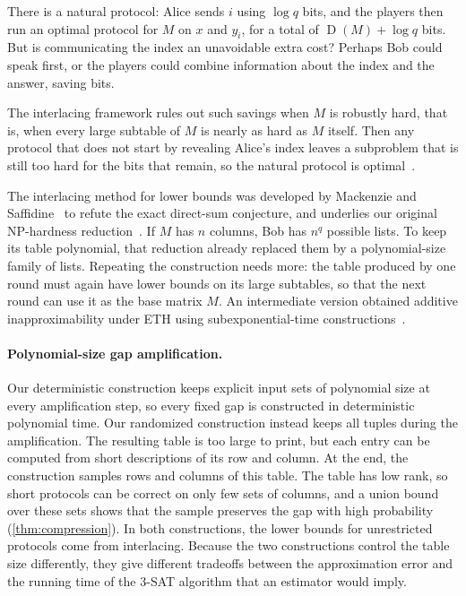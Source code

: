 \documentclass[11pt,letterpaper]{article} \usepackage[utf8]{inputenc}
\theoremstyle{plain} \newtheorem{theorem}{Theorem}[section]
\theoremstyle{definition} \newaliascnt{definition}{theorem}
\newcommand{\D}{\operatorname{D}}
\begin{document}
There is a natural protocol: Alice sends $i$ using $\log q$ bits, and the
players then run an optimal protocol for $M$ on $x$ and $y_i$, for a total
of $\D(M)+\log q$ bits. But is communicating the index an unavoidable extra
cost? Perhaps Bob could speak first, or the players could combine
information about the index and the answer, saving bits.

The interlacing framework rules out such savings when $M$ is robustly
hard, that is, when every large subtable of $M$ is nearly as hard as $M$
itself. Then any protocol that does not start by revealing Alice's index
leaves a subproblem that is still too hard for the bits that remain, so
the natural protocol is optimal~\cite{mackenzie2025refuting,gaspers-he-mackenzie-npcc}.

The interlacing method for lower bounds was developed by Mackenzie and
Saffidine~\cite{mackenzie2025refuting} to refute the exact direct-sum
conjecture, and underlies our original NP-hardness
reduction~\cite{gaspers-he-mackenzie-npcc}.
If $M$ has $n$ columns, Bob has $n^q$ possible lists. To keep its table
polynomial, that reduction already replaced them by a polynomial-size
family of lists.
Repeating the construction needs more: the table produced by one round must
again have lower bounds on its large subtables, so that the next round can
use it as the base matrix $M$. An intermediate version obtained
additive inapproximability under ETH using subexponential-time
constructions~\cite{gaspers2026interlacingeth}.

\paragraph{Polynomial-size gap amplification.}

Our deterministic construction keeps explicit input sets of polynomial
size at every amplification step, so every fixed gap is constructed in
deterministic polynomial time. Our randomized construction instead keeps
all tuples during the amplification. The resulting table is too large to
print, but each entry can be computed from short descriptions of its row
and column. At the end, the construction samples rows and columns of this
table. The table has low rank, so short protocols can be correct on only
few sets of columns, and a union bound over these sets shows that the
sample preserves the gap with high probability (\cref{thm:compression}). In both constructions, the
lower bounds for unrestricted protocols come from interlacing. Because the
two constructions control the table size differently, they give different
tradeoffs between the approximation error and the running time of the
$3$-SAT algorithm that an estimator would imply.
\end{document}
